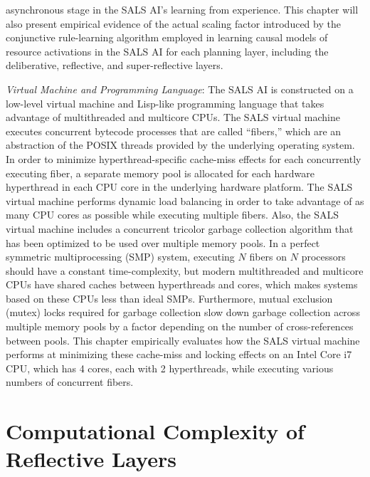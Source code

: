 \begin{packed_enumerate}
{  asynchronous stage in the SALS AI's learning from experience.  This
  chapter will also present empirical evidence of the actual scaling
  factor introduced by the conjunctive rule-learning algorithm
  employed in learning causal models of resource activations in the
  SALS AI for each planning layer, including the deliberative,
  reflective, and super-reflective layers.}
\item{\emph{Virtual Machine and Programming Language}: The SALS AI is
  constructed on a low-level virtual machine and Lisp-like programming
  language that takes advantage of multithreaded and multicore CPUs.
  The SALS virtual machine executes concurrent bytecode processes that
  are called ``fibers,'' which are an abstraction of the POSIX threads
  provided by the underlying operating system.  In order to minimize
  hyperthread-specific cache-miss effects for each concurrently
  executing fiber, a separate memory pool is allocated for each
  hardware hyperthread in each CPU core in the underlying hardware
  platform.  The SALS virtual machine performs dynamic load balancing
  in order to take advantage of as many CPU cores as possible while
  executing multiple fibers.  Also, the SALS virtual machine includes
  a concurrent tricolor garbage collection algorithm that has been
  optimized to be used over multiple memory pools.  In a perfect
  symmetric multiprocessing (SMP) system, executing $N$ fibers on $N$
  processors should have a constant time-complexity, but modern
  multithreaded and multicore CPUs have shared caches between
  hyperthreads and cores, which makes systems based on these CPUs less
  than ideal SMPs.  Furthermore, mutual exclusion (mutex) locks
  required for garbage collection slow down garbage collection across
  multiple memory pools by a factor depending on the number of
  cross-references between pools.  This chapter empirically evaluates
  how the SALS virtual machine performs at minimizing these cache-miss
  and locking effects on an Intel Core i7 CPU, which has 4 cores, each
  with 2 hyperthreads, while executing various numbers of concurrent
  fibers.}
\end{packed_enumerate}

\section{Computational Complexity of Reflective Layers}

